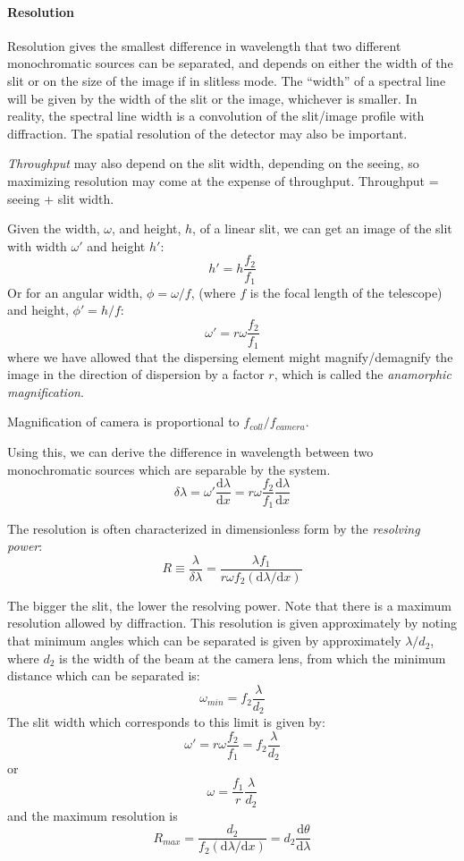 \documentclass[12pt]{article}
\newcommand{\mynotes}[1]{\textcolor{myBlue}{#1}}
\begin{document}
\paragraph{Resolution}
Resolution gives the smallest difference in wavelength that two different
monochromatic sources can be separated, and depends on either the width of the
slit or on the size of the image if in slitless mode. The ``width'' of a
spectral line will be given by the width of the slit or the image, whichever is
smaller. In reality, the spectral line width is a convolution of the slit/image
profile with diffraction. The spatial resolution of the detector may also be
important.

\textit{Throughput} may also depend on the slit width, depending on
the seeing, so maximizing resolution may come at the expense of
throughput. \mynotes{Throughput = seeing + slit width.}

Given the width, $\omega$, and height, $h$, of a linear slit, we can get an
image of the slit with width $\omega'$ and height $h'$:
\[
    h' = h\frac{f_{2}}{f_{1}}
    \]
Or for an angular width, $\phi = \omega/f$,
(where $f$ is the focal length of the telescope) and height,
$\phi' = h/f$:
\[
\omega' = r\omega\frac{f_{2}}{f_{1}}
    \]
where we have allowed that the dispersing element might magnify/demagnify the
image in the direction of dispersion by a factor $r$, which is called the
\textit{anamorphic magnification}.

\mynotes{Magnification of camera is proportional to $f_{coll}/f_{camera}$.}

Using this, we can derive the difference in wavelength between two
monochromatic sources which are separable by the system.
\[
    \delta\lambda
    = \omega'\frac{\textrm{d}\lambda}{\textrm{d}x}
    = r\omega\frac{f_{2}}{f_{1}}\frac{\textrm{d}\lambda}{\textrm{d}x}
    \]

The resolution is often characterized in dimensionless form by
the \textit{resolving power}:
\[
    R \equiv \frac{\lambda}{\delta\lambda}
    = \frac{\lambda{f_{1}}}{r\omega{f_{2}}\left(
    \mathrm{d}\lambda/\textrm{d}x\right)}
    \]

The bigger the slit, the lower the resolving power.
Note that there is a maximum resolution allowed by diffraction. This resolution
is given approximately by noting that minimum angles which can be separated is
given by approximately $\lambda/d_{2}$, where $d_{2}$ is the width of the beam
at the camera lens, from which the minimum distance which can be separated is:
\[
    \omega_{min} = f_{2}\frac{\lambda}{d_{2}}
    \]
The slit width which corresponds to this limit is given by:
\[
    \omega' = r\omega\frac{f_{2}}{f_{1}} = f_{2}\frac{\lambda}{d_{2}}
    \]
or
\[
    \omega = \frac{f_{1}}{r}\frac{\lambda}{d_{2}}
    \]
and the maximum resolution is
\[
    R_{max} =
    \frac{d_{2}}{f_{2}\left(\mathrm{d}\lambda/\mathrm{d}x\right)} =
    d_{2}\frac{\mathrm{d}\theta}{\mathrm{d}\lambda}
    \]
\end{document}
